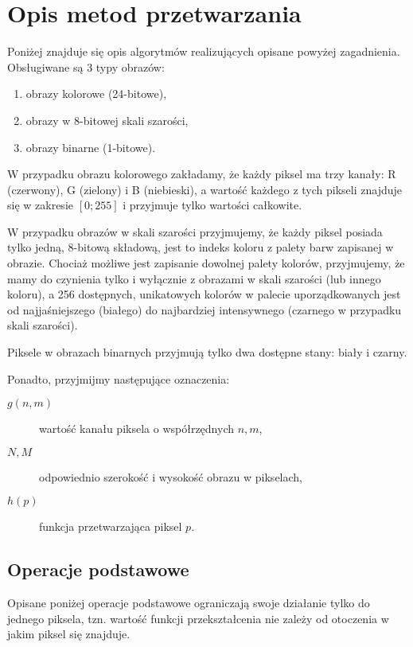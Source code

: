 \documentclass{classrep}
\begin{document}
\section{Opis metod przetwarzania}

Poniżej znajduje się opis algorytmów realizujących opisane powyżej zagadnienia. Obsługiwane są 3 typy obrazów:
\begin{enumerate}
 \item obrazy kolorowe (24-bitowe),
 \item obrazy w 8-bitowej skali szarości,
 \item obrazy binarne (1-bitowe).
\end{enumerate}

W przypadku obrazu kolorowego zakładamy, że każdy piksel ma trzy kanały: R (czerwony), G (zielony) i B (niebieski), a wartość każdego z tych pikseli znajduje się w zakresie $[0; 255]$ i przyjmuje tylko wartości całkowite.

W przypadku obrazów w skali szarości przyjmujemy, że każdy piksel posiada tylko jedną, 8-bitową składową, jest to indeks koloru z palety barw zapisanej w obrazie. Chociaż możliwe jest zapisanie dowolnej palety kolorów, przyjmujemy, że mamy do czynienia tylko i wyłącznie z obrazami w skali szarości (lub innego koloru), a 256 dostępnych, unikatowych kolorów w palecie uporządkowanych jest od najjaśniejszego (białego) do najbardziej intensywnego (czarnego \ppauza w przypadku skali szarości).

Piksele w obrazach binarnych przyjmują tylko dwa dostępne stany: biały i czarny.

Ponadto, przyjmijmy następujące oznaczenia:
\begin{description}
 \item[$g(n, m)$] wartość kanału piksela o współrzędnych $n, m$,
 \item[$N, M$] odpowiednio szerokość i wysokość obrazu w pikselach,
 \item[$h(p)$] funkcja przetwarzająca piksel $p$.
\end{description}


\subsection{Operacje podstawowe}

Opisane poniżej operacje podstawowe ograniczają swoje działanie tylko do jednego piksela, tzn. wartość funkcji przekształcenia nie zależy od otoczenia w jakim piksel się znajduje.
\end{document}

